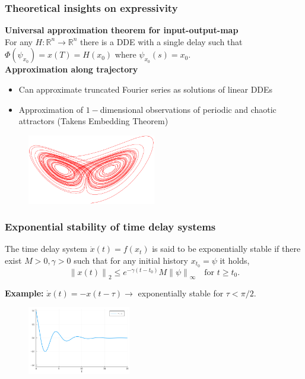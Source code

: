 \documentclass[11pt,aspectratio=169]{beamer}
\newcommand{\norm}[1]{\left\lVert#1\right\rVert}
\newcommand{\R}{\mathbb{R}}
\begin{document}

\begin{frame}[t]
    \frametitle{Theoretical insights on expressivity}
    \textbf{Universal approximation theorem for input-output-map}\\\vspace{0.1cm}
    For any $H:\R^n \to\R^n$ there is a DDE with a single delay such that $\Phi(\psi_{x_0}) = x(T) = H(x_0)$ where $\psi_{x_0}(s)=x_0$.\\
    \vspace{0.25cm}
    \textbf{Approximation along trajectory}
    \begin{itemize}
        \item Can approximate truncated Fourier series as solutions of linear DDEs
        \item Approximation of $1-$dimensional observations of periodic and chaotic attractors (Takens Embedding Theorem)
     \end{itemize}
    \begin{figure}
        \centering
        \includegraphics[width=0.5\textwidth]{figures/lorenz.png}
    \end{figure}
\end{frame}


\begin{frame}[t]
    \frametitle{Exponential stability of time delay systems}
    \begin{definition}
    The time delay system $\dot{x}(t) = f(x_t)$ is said to be exponentially stable if there exist $M>0, \gamma>0$ such that for any initial history $x_{t_0} = \psi$ it holds,
    $$\norm{x(t)}_2 \leq e^{-\gamma (t-t_0)}M\norm{\psi}_\infty \quad \text{for } t\geq t_0.$$
    \end{definition}
    \textbf{Example: } $\dot{x}(t) = -x(t-\tau) \to$ exponentially stable for $\tau<\pi/2$.
    \begin{figure}
        \centering
        \includegraphics[width=0.4\textwidth]{figures/linear_dde.png}
    \end{figure}
    
\end{frame}
\end{document}
